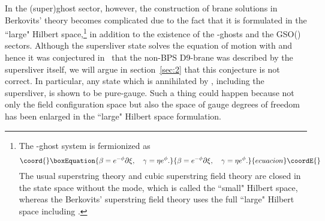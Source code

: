 \documentclass[a4paper,12pt]{article}
\providecommand{\cQ}{\mathcal{Q}}
\providecommand{\Qmid}{\cQ_{\mathrm{GRSZ}}}
\begin{document}
In the (super)ghost sector, however, the construction of brane solutions in Berkovits' theory becomes 
complicated due to the fact that it is formulated in the ``large" Hilbert space,\footnote{The 
\myHighlight{$\beta\gamma$}\coordHE{}-ghost system is fermionized as 
\begin{equation}\coord{}\boxEquation{
\beta=e^{-\phi}\partial\xi, \quad \gamma=\eta e^{\phi}. \label{eq:FMS}
}{
\beta=e^{-\phi}\partial\xi, \quad \gamma=\eta e^{\phi}. }{ecuacion}\coordE{}\end{equation}
The usual superstring theory and cubic superstring field theory are closed in the state space 
without the \coordHE{} mode, which is called the ``small" Hilbert space, whereas the Berkovits' 
superstring field theory uses the full ``large" Hilbert space including \coordHE{}.}
in addition to the existence of the \myHighlight{$\beta\gamma$}\coordHE{}-ghosts and the GSO(\myHighlight{$\pm$}\coordHE{}) sectors. Although 
the supersliver state \myHighlight{$\Xi$}\coordHE{} solves the equation of motion with \myHighlight{$\cQ=\Qmid=(c(i)-c(-i))/2i$}\coordHE{} and 
hence it was conjectured in~\cite{MS} that the non-BPS D9-brane was described by the 
supersliver itself, we will argue in section~\ref{sec:2} that this conjecture is not correct. 
In particular, any state which is annihilated by \coordHE{}, including the supersliver, is shown to 
be pure-gauge. Such a thing could happen because not only the field configuration space but also 
the space of gauge degrees of freedom has been enlarged in the ``large" Hilbert space formulation. 
\smallskip
\end{document}
